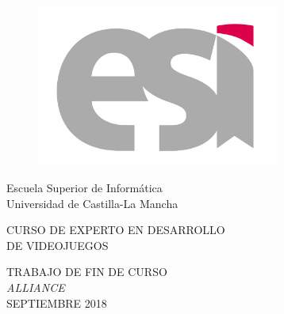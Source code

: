 \vspace*{1.5in}
\begin{center}
\vspace*{-1in}
\begin{figure}[htb]
\begin{center}
\includegraphics[width=8cm]{./images/LogoESI.jpg} 
\end{center}
\end{figure}
\end{center}
\begin{center}
Escuela Superior de Informática \\
Universidad de Castilla-La Mancha \\
\vspace*{0.8in}

\begin{Large}
CURSO DE EXPERTO EN DESARROLLO\\
DE VIDEOJUEGOS \\
\end{Large}

\vspace*{0.8in}
\begin{large}
TRABAJO DE FIN DE CURSO \\
\vspace*{0.8in}
\textit{ALLIANCE} \\
SEPTIEMBRE 2018
\end{large}
\end{center}
